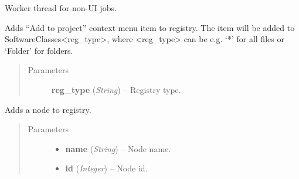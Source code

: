 \documentclass[letterpaper,10pt,english]{sphinxmanual}
\begin{document}
\begin{fulllineitems}
\label{threads:threads.worker.WORKER_THREAD}
Worker thread for non-UI jobs.

\begin{fulllineitems}
\label{threads:threads.worker.WORKER_THREAD.add_project_registry_entry}
Adds ``Add to project'' context menu item to registry. The item
will be added to SoftwareClasses\textless{}reg\_type\textgreater{}, where \textless{}reg\_type\textgreater{}
can be e.g. `*' for all files or `Folder' for folders.
\begin{quote}\begin{description}
\item[{Parameters}] \leavevmode
\textbf{reg\_type} (\emph{String}) -- Registry type.

\end{description}\end{quote}

\end{fulllineitems}


\begin{fulllineitems}
\label{threads:threads.worker.WORKER_THREAD.add_registry_entry}
Adds a node to registry.
\begin{quote}\begin{description}
\item[{Parameters}] \leavevmode\begin{itemize}
\item {} 
\textbf{name} (\emph{String}) -- Node name.

\item {} 
\textbf{id} (\emph{Integer}) -- Node id.

\end{itemize}

\end{description}\end{quote}

\end{fulllineitems}


\end{fulllineitems}
\end{document}
